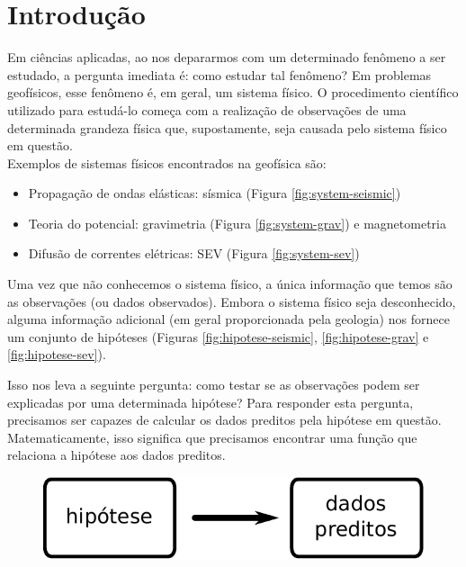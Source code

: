\chapter{Introdução}
\label{chap:intro}

\indent Em ciências aplicadas, ao nos depararmos com um determinado fenômeno a ser
estudado, a pergunta imediata é: como estudar tal fenômeno? Em problemas geofísicos,
esse fenômeno é, em geral, um sistema físico.
O procedimento científico utilizado para estudá-lo começa com a realização de
observações de uma determinada grandeza física que, supostamente, seja causada
pelo sistema físico em questão.
\\
\indent Exemplos de sistemas físicos encontrados na geofísica são:

\begin{itemize}
    \item{Propagação de ondas elásticas: sísmica (Figura \ref{fig:system-seismic})}
    \item{Teoria do potencial: gravimetria (Figura \ref{fig:system-grav}) e magnetometria}
    \item{Difusão de correntes elétricas: SEV (Figura \ref{fig:system-sev})}
\end{itemize}

\indent Uma vez que não conhecemos o sistema físico, a única informação que temos são as
observações (ou dados observados). Embora o sistema físico seja
desconhecido, alguma informação adicional (em geral proporcionada pela geologia)
nos fornece um conjunto de hipóteses (Figuras \ref{fig:hipotese-seismic},
\ref{fig:hipotese-grav} e \ref{fig:hipotese-sev}).


\indent Isso nos leva a seguinte pergunta: como testar se as observações podem ser
explicadas por uma determinada hipótese? Para responder esta pergunta,
precisamos ser capazes de calcular os dados preditos pela hipótese em questão.
Matematicamente, isso significa que precisamos encontrar uma função que
relaciona a hipótese aos dados preditos.

\begin{figure}[!htb]
  \centering
    \includegraphics[scale=0.7]{figs/hipotese-preditos}
  \label{fig:hipotese-preditos}
\end{figure}

